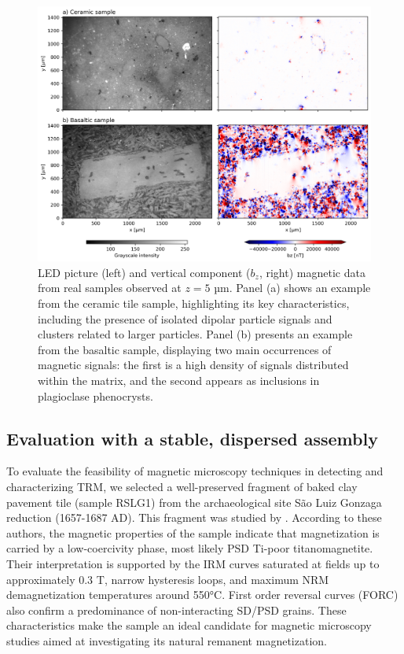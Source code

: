 \begin{figure}[tb!]
  \centering
  \includegraphics[width=1\linewidth]{paper/figures/real-data-maps.png}
  \caption{
   LED picture (left) and vertical component (\(b_z\), right) magnetic data from real samples observed at \(z = 5\) µm. Panel (a) shows an example from the ceramic tile sample, highlighting its key characteristics, including the presence of isolated dipolar particle signals and clusters related to larger particles. Panel (b) presents an example from the basaltic sample, displaying two main occurrences of magnetic signals: the first is a high density of signals distributed within the matrix, and the second appears as inclusions in plagioclase phenocrysts.
  }
  \label{real-data-maps}
\end{figure}

\subsection{Evaluation with a stable, dispersed assembly}

To evaluate the feasibility of magnetic microscopy techniques in detecting and characterizing TRM, we selected a well-preserved fragment of baked clay pavement tile (sample RSLG1) from the archaeological site São Luiz Gonzaga reduction (1657-1687 AD). This fragment was studied by \citet{Poletti2016}. According to these authors, the magnetic properties of the sample indicate that magnetization is carried by a low-coercivity phase, most likely PSD Ti-poor titanomagnetite. Their interpretation is supported by the IRM curves saturated at fields up to approximately 0.3 T, narrow hysteresis loops, and maximum NRM demagnetization temperatures around 550°C. First order reversal curves (FORC) also confirm a predominance of non-interacting SD/PSD grains. These characteristics make the sample an ideal candidate for magnetic microscopy studies aimed at investigating its natural remanent magnetization.

